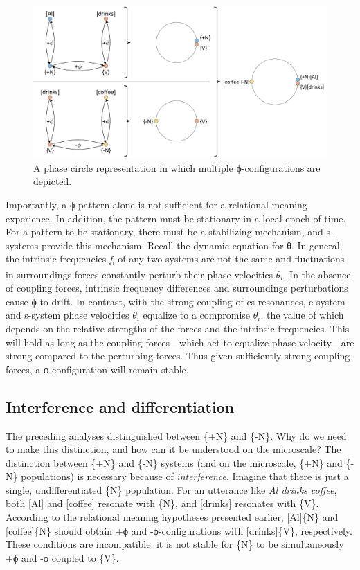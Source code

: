   
\begin{figure}
\includegraphics[width=\textwidth]{figures/Tilsen-img22.png}
\caption{A phase circle representation in which multiple ϕ-configurations are depicted.}
\label{fig:2:15}
\end{figure}
 

  Importantly, a ϕ pattern alone is not sufficient for a relational meaning experience. In addition, the pattern must be stationary in a local epoch of time. For a pattern to be stationary, there must be a stabilizing mechanism, and s-systems provide this mechanism. Recall the dynamic equation for θ. In general, the intrinsic frequencies \textit{f}\textsubscript{i} of any two systems are not the same and fluctuations in surroundings forces constantly perturb their phase velocities $\dot{\theta}_i$. In the absence of coupling forces, intrinsic frequency differences and surroundings perturbations cause ϕ to drift. In contrast, with the strong coupling of cs-resonances, c-system and s-system phase velocities $\dot{\theta}_i$ equalize to a compromise $\dot{\theta}_i$, the value of which depends on the relative strengths of the forces and the intrinsic frequencies. This will hold as long as the coupling forces—which act to equalize phase velocity—are strong compared to the perturbing forces. Thus given sufficiently strong coupling forces, a ϕ-configuration will remain stable.

\subsection{Interference and differentiation}

The preceding analyses distinguished between \{+N\} and \{-N\}. Why do we need to make this distinction, and how can it be understood on the microscale? The distinction between \{+N\} and \{-N\} systems (and on the microscale, \{+N\} and \{-N\} populations) is necessary because of \textit{interference}. Imagine that there is just a single, undifferentiated \{N\} population. For an utterance like \textit{Al drinks coffee}, both [Al] and [coffee] resonate with \{N\}, and [drinks] resonates with \{V\}. According to the relational meaning hypotheses presented earlier, [Al]\{N\} and [coffee]\{N\} should obtain +ϕ and -ϕ-configurations with [drinks]\{V\}, respectively. These conditions are incompatible: it is not stable for \{N\} to be simultaneously +ϕ and -ϕ coupled to \{V\}.

